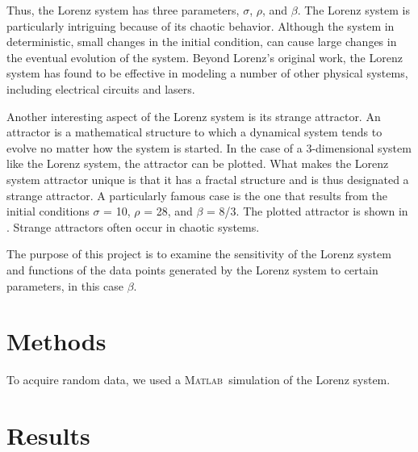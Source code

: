 \documentclass{article}[11pt]
\newcommand{\Matlab}{\textsc{Matlab}}
\begin{document}
Thus, the Lorenz system has three parameters, $\sigma$, $\rho$, and $\beta$.  The Lorenz system is particularly intriguing because of its chaotic behavior.  Although the system in deterministic, small changes in the initial condition, can cause large changes in the eventual evolution of the system.  Beyond Lorenz's original work, the Lorenz system has found to be effective in modeling a number of other physical systems, including electrical circuits and lasers.

Another interesting aspect of the Lorenz system is its strange attractor.  An attractor is a mathematical structure to which a dynamical system tends to evolve no matter how the system is started.  In the case of a 3-dimensional system like the Lorenz system, the attractor can be plotted.  What makes the Lorenz system attractor unique is that it has a fractal structure and is thus designated a strange attractor.  A particularly famous case is the one that results from the initial conditions $\sigma$ = 10, $\rho$ = 28, and $\beta$ = 8/3.  The plotted attractor is shown in .  Strange attractors often occur in chaotic systems.

The purpose of this project is to examine the sensitivity of the Lorenz system and functions of the data points generated by the Lorenz system to certain parameters, in this case $\beta$.
\section{Methods}
\label{sec:methods}

To acquire random data, we used a \Matlab \ simulation of the Lorenz system.


\section{Results}
\label{sec:results}
\end{document}
